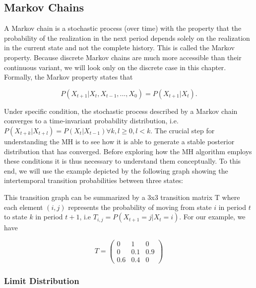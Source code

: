 \documentclass[12pt,english,a4paper,oneside]{article}
\theoremstyle{definition}
\theoremstyle{definition}
\theoremstyle{definition}
\theoremstyle{definition}
\theoremstyle{remark}
\begin{document}
\hypertarget{markov-chains}{%
\subsection{Markov Chains}\label{markov-chains}}

A Markov chain is a stochastic process (over time) with the property that the probability of the realization in the next period depends solely on the realization in the current state and not the complete history. This is called the Markov property. Because discrete Markov chains are much more accessible than their continuous variant, we will look only on the discrete case in this chapter. Formally, the Markov property states that

\begin{equation}
\tag{eq:markov-property}
P(X_{t+1} |X_{t}, X_{t-1}, ..., X_{0}) = P(X_{t+1} |X_{t}).
\end{equation}

Under specific condition, the stochastic process described by a Markov chain converges to a time-invariant probability distribution, i.e.~\(P(X_{t+k} |X_{t+l}) = P(X_{t} |X_{t-1}) \forall k,l \geq 0, l < k\). The crucial step for understanding the MH is to see how it is able to generate a stable posterior distribution that has converged. Before exploring how the MH algorithm employs these conditions it is thus necessary to understand them conceptually. To this end, we will use the example depicted by the following graph showing the intertemporal transition probabilities between three states:

This transition graph can be summarized by a 3x3 transition matrix T where each element \((i,j)\) represents the probability of moving from state \(i\) in period \(t\) to state \(k\) in period \(t+1\), i.e \(T_{i,j} = P(X_{t+1}=j | X_t = i)\). For our example, we have

\begin{equation}
\tag{eq:markov-property}
T=
\begin{pmatrix}
0 & 1 & 0\\
0 & 0.1 & 0.9\\
0.6 & 0.4 & 0
\end{pmatrix}\end{equation}

\hypertarget{limit-distribution}{%
\subsubsection{Limit Distribution}\label{limit-distribution}}
\end{document}
